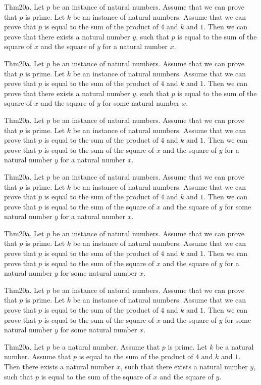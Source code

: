 \documentclass{article}
\begin{document}
Thm20a. Let $p$ be an instance of natural numbers. Assume that we can prove that $p$ is prime. Let $k$ be an instance of natural numbers. Assume that we can prove that $p$ is equal to the sum of the product of $4$ and $k$ and $1$. Then we can prove that there exists a natural number $y$, such that $p$ is equal to the sum of the square of $x$ and the square of $y$ for a natural number $x$.

Thm20a. Let $p$ be an instance of natural numbers. Assume that we can prove that $p$ is prime. Let $k$ be an instance of natural numbers. Assume that we can prove that $p$ is equal to the sum of the product of $4$ and $k$ and $1$. Then we can prove that there exists a natural number $y$, such that $p$ is equal to the sum of the square of $x$ and the square of $y$ for some natural number $x$.

Thm20a. Let $p$ be an instance of natural numbers. Assume that we can prove that $p$ is prime. Let $k$ be an instance of natural numbers. Assume that we can prove that $p$ is equal to the sum of the product of $4$ and $k$ and $1$. Then we can prove that $p$ is equal to the sum of the square of $x$ and the square of $y$ for a natural number $y$ for a natural number $x$.

Thm20a. Let $p$ be an instance of natural numbers. Assume that we can prove that $p$ is prime. Let $k$ be an instance of natural numbers. Assume that we can prove that $p$ is equal to the sum of the product of $4$ and $k$ and $1$. Then we can prove that $p$ is equal to the sum of the square of $x$ and the square of $y$ for some natural number $y$ for a natural number $x$.

Thm20a. Let $p$ be an instance of natural numbers. Assume that we can prove that $p$ is prime. Let $k$ be an instance of natural numbers. Assume that we can prove that $p$ is equal to the sum of the product of $4$ and $k$ and $1$. Then we can prove that $p$ is equal to the sum of the square of $x$ and the square of $y$ for a natural number $y$ for some natural number $x$.

Thm20a. Let $p$ be an instance of natural numbers. Assume that we can prove that $p$ is prime. Let $k$ be an instance of natural numbers. Assume that we can prove that $p$ is equal to the sum of the product of $4$ and $k$ and $1$. Then we can prove that $p$ is equal to the sum of the square of $x$ and the square of $y$ for some natural number $y$ for some natural number $x$.

Thm20a. Let $p$ be a natural number. Assume that $p$ is prime. Let $k$ be a natural number. Assume that $p$ is equal to the sum of the product of $4$ and $k$ and $1$. Then there exists a natural number $x$, such that there exists a natural number $y$, such that $p$ is equal to the sum of the square of $x$ and the square of $y$.
\end{document}
